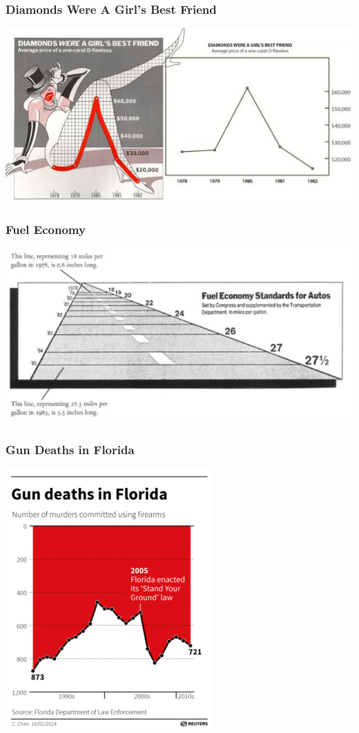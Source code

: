 \documentclass{beamer} %
\begin{document}
\begin{frame}\frametitle{Diamonds Were A Girl's Best Friend}
		\centering
	\includegraphics[width=\linewidth]{diamonds.jpg}
\end{frame}


\begin{frame}\frametitle{Fuel Economy}
		\centering
	\includegraphics[width=\linewidth]{fuel.jpg}
\end{frame}


\begin{frame}\frametitle{Gun Deaths in Florida}
	\centering
	\includegraphics[width=0.6\linewidth]{guns.png}
\end{frame}
\end{document}
